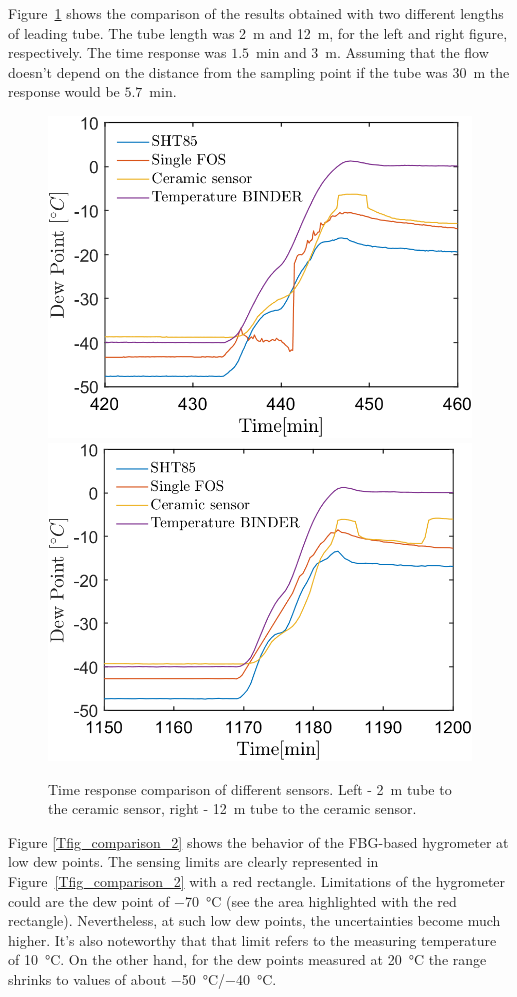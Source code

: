 Figure~\ref{fig_comparison_hw} shows the comparison of the results obtained with two different lengths of leading tube. The tube length was \SI{2}{\metre} and \SI{12}{\metre}, for the left and right figure, respectively. The time response was $1.5$~min and $3$~m. Assuming that the flow doesn't depend on the distance from the sampling point if the tube was $30$~m the response would be $5.7$~min. 
\begin{figure}[!h]
\centering
\includegraphics[width=0.47\columnwidth]{Chapter5/images/DPCPercent_response2m.png}
\includegraphics[width=0.47\columnwidth]{Chapter5/images/DPCPercent_response12m.png}
\caption{Time response comparison of different sensors. Left - \SI{2}{\metre} tube to the ceramic sensor, right - \SI{12}{\metre} tube to the ceramic sensor.}
\label{fig_comparison_hw}
\end{figure}
\newpage
Figure \ref{Tfig_comparison_2} shows the behavior of the \gls{FBG}-based hygrometer at low dew points. The sensing limits are clearly represented in Figure~\ref{Tfig_comparison_2} with a red rectangle. Limitations of the hygrometer could are the dew point of \SI{-70}{\celsius} (see the area highlighted with the red rectangle). Nevertheless, at such low dew points, the uncertainties become much higher. It's also noteworthy that that limit refers to the measuring temperature of \SI{10}{\celsius}. On the other hand, for the dew points measured at \SI{20}{\celsius} the range shrinks to values of about \SI{-50}{\celsius}/\SI{-40}{\celsius}.

